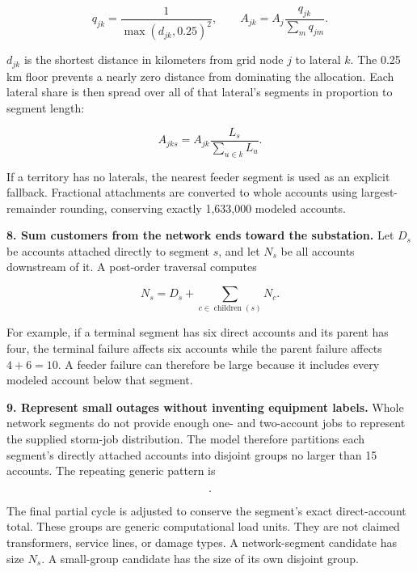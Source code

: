 \documentclass[11pt]{article}
\begin{document}
\begin{equation}
  q_{jk}=\frac{1}{\max(d_{jk},0.25)^2},
  \qquad
  A_{jk}=A_j\frac{q_{jk}}{\sum_m q_{jm}}.
  \label{eq:lateral-allocation}
\end{equation}

$d_{jk}$ is the shortest distance in kilometers from grid node $j$ to lateral $k$. The 0.25 km floor prevents a nearly zero distance from dominating the allocation. Each lateral share is then spread over all of that lateral's segments in proportion to segment length:

\begin{equation}
  A_{jks}=A_{jk}\frac{L_s}{\sum_{u\in k}L_u}.
  \label{eq:length-allocation}
\end{equation}

If a territory has no laterals, the nearest feeder segment is used as an explicit fallback. Fractional attachments are converted to whole accounts using largest-remainder rounding, conserving exactly 1,633,000 modeled accounts.

\textbf{8. Sum customers from the network ends toward the substation.}
Let $D_s$ be accounts attached directly to segment $s$, and let $N_s$ be all accounts downstream of it. A post-order traversal computes

\begin{equation}
  N_s=D_s+\sum_{c\in\operatorname{children}(s)}N_c.
  \label{eq:downstream}
\end{equation}

For example, if a terminal segment has six direct accounts and its parent has four, the terminal failure affects six accounts while the parent failure affects $4+6=10$. A feeder failure can therefore be large because it includes every modeled account below that segment.

\textbf{9. Represent small outages without inventing equipment labels.}
Whole network segments do not provide enough one- and two-account jobs to represent the supplied storm-job distribution. The model therefore partitions each segment's directly attached accounts into disjoint groups no larger than 15 accounts. The repeating generic pattern is

\begin{equation}
  [1,1,1,1,1,1,1,1,2,3,5,8,12,15].
  \label{eq:group-pattern}
\end{equation}

The final partial cycle is adjusted to conserve the segment's exact direct-account total. These groups are generic computational load units. They are not claimed transformers, service lines, or damage types. A network-segment candidate has size $N_s$. A small-group candidate has the size of its own disjoint group.
\end{document}
